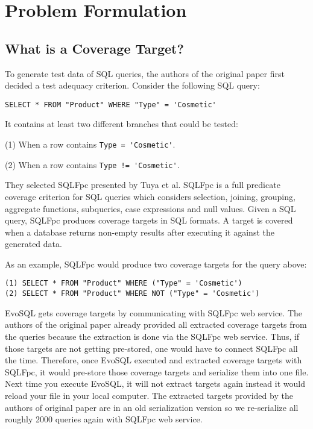 \chapter{Problem Formulation}

\section{What is a Coverage Target?}

To generate test data of SQL queries, the authors of the original paper first decided a test adequacy criterion. Consider the following SQL query:

\begin{verbatim}
SELECT * FROM "Product" WHERE "Type" = 'Cosmetic'
\end{verbatim}
It contains at least two different branches that could be tested:

(1) When a row contains \verb|Type = 'Cosmetic'|.

(2) When a row contains \verb|Type != 'Cosmetic'|.

They selected SQLFpc presented by Tuya et al. SQLFpc is a full predicate coverage criterion for SQL queries which considers selection, joining, grouping, aggregate functions, subqueries, case expressions and null values. Given a SQL query, SQLFpc produces coverage targets in SQL formats. A target is covered when a database returns non-empty results after executing it against the generated data.

As an example, SQLFpc would produce two coverage targets for the query above:
\begin{verbatim}
(1) SELECT * FROM "Product" WHERE ("Type" = 'Cosmetic')
(2) SELECT * FROM "Product" WHERE NOT ("Type" = 'Cosmetic')
\end{verbatim}

EvoSQL gets coverage targets by communicating with SQLFpc web service. The authors of the original paper already provided all extracted coverage targets from the queries because the extraction is done via the SQLFpc web service. Thus, if those targets are not getting pre-stored, one would have to connect SQLFpc all the time. Therefore, once EvoSQL executed and extracted coverage targets with SQLFpc, it would pre-store those coverage targets and serialize them into one file. Next time you execute EvoSQL, it will not extract targets again instead it would reload your file in your local computer. 
The extracted targets provided by the authors of original paper are in an old serialization version so we re-serialize all roughly 2000 queries again with SQLFpc web service.

